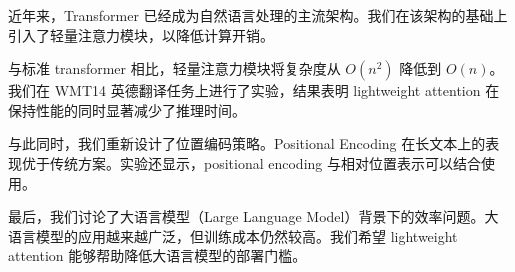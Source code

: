 近年来，Transformer 已经成为自然语言处理的主流架构。我们在该架构的基础上引入了轻量注意力模块，以降低计算开销。

与标准 transformer 相比，轻量注意力模块将复杂度从 $O(n^2)$ 降低到 $O(n)$。我们在 WMT14 英德翻译任务上进行了实验，结果表明 lightweight attention 在保持性能的同时显著减少了推理时间。

与此同时，我们重新设计了位置编码策略。Positional Encoding 在长文本上的表现优于传统方案。实验还显示，positional encoding 与相对位置表示可以结合使用。

最后，我们讨论了大语言模型（Large Language Model）背景下的效率问题。大语言模型的应用越来越广泛，但训练成本仍然较高。我们希望 lightweight attention 能够帮助降低大语言模型的部署门槛。
